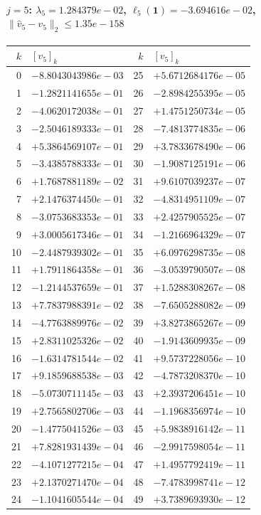 \documentclass[11pt]{article}
\begin{document}
\paragraph{$j = 5$: $\lambda_{5} = 1.284379e-02$, \quad $\ell_{5}(\mathbf{1}) = -3.694616e-02$, \quad $\|\hat{v}_{5} - v_{5}\|_2 \leq 1.35e-158$}
\begin{center}
{\footnotesize
\begin{tabular}{r@{\;\;}l@{\quad}r@{\;\;}l}
\toprule
$k$ & $[v_{5}]_k$ & $k$ & $[v_{5}]_k$ \\
\midrule
0 & $-8.8043043986e-03$ & 25 & $+5.6712684176e-05$ \\
1 & $-1.2821141655e-01$ & 26 & $-2.8984255395e-05$ \\
2 & $-4.0620172038e-01$ & 27 & $+1.4751250734e-05$ \\
3 & $-2.5046189333e-01$ & 28 & $-7.4813774835e-06$ \\
4 & $+5.3864569107e-01$ & 29 & $+3.7833678490e-06$ \\
5 & $-3.4385788333e-01$ & 30 & $-1.9087125191e-06$ \\
6 & $+1.7687881189e-02$ & 31 & $+9.6107039237e-07$ \\
7 & $+2.1476374450e-01$ & 32 & $-4.8314951109e-07$ \\
8 & $-3.0753683353e-01$ & 33 & $+2.4257905525e-07$ \\
9 & $+3.0005617346e-01$ & 34 & $-1.2166964329e-07$ \\
10 & $-2.4487939302e-01$ & 35 & $+6.0976298735e-08$ \\
11 & $+1.7911864358e-01$ & 36 & $-3.0539790507e-08$ \\
12 & $-1.2144537659e-01$ & 37 & $+1.5288308267e-08$ \\
13 & $+7.7837988391e-02$ & 38 & $-7.6505288082e-09$ \\
14 & $-4.7763889976e-02$ & 39 & $+3.8273865267e-09$ \\
15 & $+2.8311025326e-02$ & 40 & $-1.9143609935e-09$ \\
16 & $-1.6314781544e-02$ & 41 & $+9.5737228056e-10$ \\
17 & $+9.1859688538e-03$ & 42 & $-4.7873208370e-10$ \\
18 & $-5.0730711145e-03$ & 43 & $+2.3937206451e-10$ \\
19 & $+2.7565802706e-03$ & 44 & $-1.1968356974e-10$ \\
20 & $-1.4775041526e-03$ & 45 & $+5.9838916142e-11$ \\
21 & $+7.8281931439e-04$ & 46 & $-2.9917598054e-11$ \\
22 & $-4.1071277215e-04$ & 47 & $+1.4957792419e-11$ \\
23 & $+2.1370271470e-04$ & 48 & $-7.4783998741e-12$ \\
24 & $-1.1041605544e-04$ & 49 & $+3.7389693930e-12$ \\
\bottomrule
\end{tabular}
}
\end{center}
\end{document}
